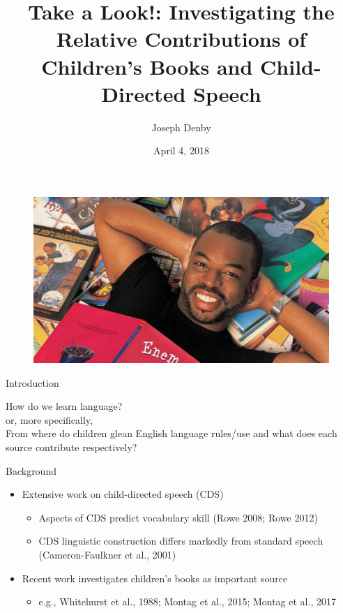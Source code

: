 \documentclass{beamer}
\title[Take a Look!]{Take a Look!: Investigating the Relative Contributions of Children's Books and Child-Directed Speech} %
\author{Joseph Denby} %
\institute[] %
{
	Perspectives on Computational Research \\ %
	\medskip
}
\date{April 4, 2018} %
\begin{document}
	
	\begin{frame}
		\titlepage %
		\begin{figure}
			\includegraphics[width=.4\linewidth]{readrainbow.jpg}
		\end{figure}
	\end{frame}
	

\begin{frame}{Introduction}
	\begin{center}
		\Huge How do we learn language? \\
		\vspace{3mm}
		\small or, more specifically, \\
		\vspace{3mm}
		\Large From where do children glean English language rules/use and what does each source contribute respectively?
	\end{center}
\end{frame}


\begin{frame}{Background}
	\begin{itemize}
		\item Extensive work on child-directed speech (CDS)
		\begin{itemize}
			\item Aspects of CDS predict vocabulary skill (Rowe 2008; Rowe 2012)
			\item CDS linguistic construction differs markedly from standard speech (Cameron-Faulkner et al., 2001)
		\end{itemize}
		\item Recent work investigates children's books as important source
		\begin{itemize}
			\item e.g., Whitehurst et al., 1988; Montag et al., 2015; Montag et al., 2017
		\end{itemize}

	\end{itemize}
\end{frame}
\end{document}
